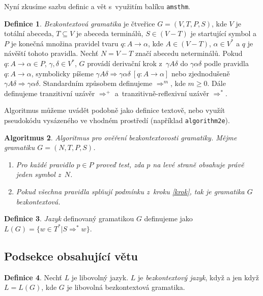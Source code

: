 \documentclass[a4paper, twocolumn, 11pt]{article}
\theoremstyle{definition}
\newtheorem{definition}{Definice}[section]
\theoremstyle{plain}
\newtheorem{algorithm}[definition]{Algoritmus}
\theoremstyle{plain}
\begin{document}
Nyní zkusíme sazbu definic a vět s~využitím balíku \texttt{amsthm}.

\begin{definition}\label{bezkontext}
\textit{Bezkontextová gramatika} je čtveřice $G = (V,T,P,S)$, kde $V$ je totální abeceda,
$T \subseteq V$ je abeceda terminálů, $S \in (V - T)$ je startující symbol a $P$ je konečná množina pravidel
tvaru $q: A \rightarrow \alpha$, kde $A \in (V - T)$, $\alpha \in V^*$ a $q$ je návěští tohoto pravidla. Nechť $N = V - T$ značí abecedu neterminálů.
Pokud $q: A \rightarrow \alpha \in P$, $\gamma, \delta \in V^*$, $G$ provádí derivační krok z~$\gamma A \delta$ do $\gamma \alpha \delta$ podle pravidla $q: A \rightarrow \alpha$, symbolicky píšeme $\gamma A \delta \Rightarrow \gamma \alpha \delta\ [q: A \rightarrow \alpha]$ nebo zjednodušeně $\gamma A \delta \Rightarrow \gamma \alpha \delta$.
Standardním způsobem definujeme $\Rightarrow^m$, kde $m\geq0$.
Dále definujeme tranzitivní uzávěr $\Rightarrow^+$ a~tranzitivně-reflexivní uzávěr $\Rightarrow^*$.
\end{definition}

Algoritmus můžeme uvádět podobně jako definice textově, nebo využít pseudokódu vysázeného ve vhodném prostředí (například \texttt{algorithm2e}).

\begin{algorithm}
Algoritmus pro ověření bezkontextovosti gramatiky. Mějme gramatiku $G = (N, T, P, S)$.

\begin{enumerate}
\item\label{krok} Pro každé pravidlo $p \in P$ proveď test, zda $p$ na levé straně obsahuje právě jeden symbol z~$N$.
\item Pokud všechna pravidla splňují podmínku z~kroku \ref{krok}, tak je gramatika $G$ bezkontextová.
\end{enumerate}

\end{algorithm}

\begin{definition}
\textit{Jazyk} definovaný gramatikou $G$ definujeme jako $L(G) = \{ w \in T^*|S \Rightarrow^* w\}$.
\end{definition}

\subsection{Podsekce obsahující větu}

\begin{definition}
Nechť $L$ je libovolný jazyk. $L$ je \textit{bezkontextový jazyk}, když a jen když $L = L(G)$, kde $G$ je libovolná bezkontextová gramatika.
\end{definition}
\end{document}

